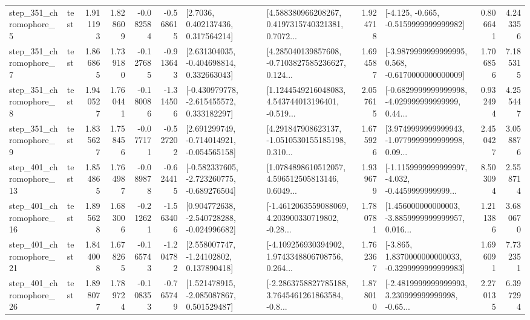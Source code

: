 \begin{tabular}{llrrrrllrlrr}
   step\_351\_chromophore\_5 &      test &      1.911193 &    1.828609 &     -0.082584 & -0.568615 &          [2.7036, 0.402137436, 0.317564214] &  [4.588380966208267, 0.4197315740321381, 0.7072... &       1.924718 &              [-4.125, -0.665, -0.5159999999999982] &            0.806641 &          4.243356 \\
   step\_351\_chromophore\_7 &      test &      1.866865 &    1.739180 &     -0.127685 & -0.913643 &    [2.631304035, -0.404698814, 0.332663043] &  [4.285040139857608, -0.7103827585236627, 0.124... &       1.694587 &  [-3.9879999999999995, 0.568, -0.6170000000000009] &            1.706856 &          7.185315 \\
   step\_351\_chromophore\_8 &      test &      1.940527 &    1.760441 &     -0.180086 & -1.314506 &   [-0.430979778, -2.615455572, 0.333182297] &  [1.1244549216048083, 4.543744013196401, -0.519... &       2.057615 &  [-0.6829999999999998, -4.029999999999999, 0.44... &            0.932494 &          4.255447 \\
   step\_351\_chromophore\_9 &      test &      1.835627 &    1.758456 &     -0.077171 & -0.527202 &   [2.691299749, -0.714014921, -0.054565158] &  [4.291847908623137, -1.0510530155185198, 0.310... &       1.675926 &  [3.9749999999999943, -1.0779999999999998, 0.09... &            2.450427 &          3.058876 \\
  step\_401\_chromophore\_13 &      test &      1.854865 &    1.764987 &     -0.089878 & -0.624415 &  [-0.582337605, -2.723260775, -0.689276504] &  [1.0784898610512057, 4.596512505813146, 0.6049... &       1.939679 &  [-1.1159999999999997, -4.032, -0.4459999999999... &            8.503094 &          2.558714 \\
  step\_401\_chromophore\_16 &      test &      1.895628 &    1.683006 &     -0.212621 & -1.563406 &   [0.904772638, -2.540728288, -0.024996682] &  [-1.4612063559088069, 4.203900330719802, -0.28... &       1.780781 &  [1.456000000000003, -3.8859999999999957, 0.016... &            1.211386 &          3.680670 \\
  step\_401\_chromophore\_21 &      test &      1.844008 &    1.678265 &     -0.165743 & -1.204782 &     [2.558007747, -1.24102802, 0.137890418] &  [-4.109256930394902, 1.9743348806708756, 0.264... &       1.762367 &  [-3.865, 1.8370000000000033, -0.3299999999999983] &            1.696091 &          7.732351 \\
  step\_401\_chromophore\_26 &      test &      1.898077 &    1.789724 &     -0.108353 & -0.765749 &    [1.521478915, -2.085087867, 0.501529487] &  [-2.2863758827785188, 3.7645461261863584, -0.8... &       1.878010 &  [-2.4819999999999993, 3.230999999999998, -0.65... &            2.270135 &          6.397294 \\

\end{tabular}
